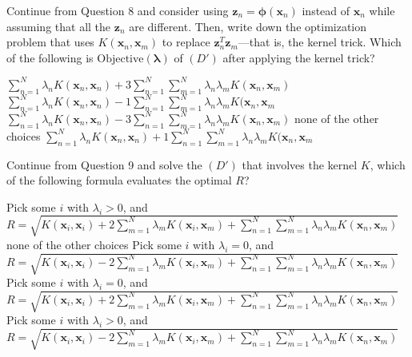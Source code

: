 \documentclass[a4paper,10pt]{exam}
\begin{document}
\begin{questions}
   \question Continue from Question 8 and consider using $\mathbf{z}_n = {\boldsymbol\phi}(\mathbf{x}_n)$ instead of $\mathbf{x}_n$ while assuming that all the $\mathbf{z}_n$ are different. Then, write down the optimization problem that uses $K(\mathbf{x}_n, \mathbf{x}_m)$ to replace $\mathbf{z}_n^T \mathbf{z}_m$---that is, the kernel trick. Which of the following is $\mbox{Objective}(\boldsymbol\lambda)$ of $(D′)$ after applying the kernel trick?
   \begin{checkboxes}
   	\choice $\sum_{n=1}^N \lambda_n K(\mathbf{x}_n, \mathbf{x}_n) + 3\sum_{n=1}^N \sum_{m=1}^N \lambda_n \lambda_m K(\mathbf{x}_n, \mathbf{x}_m)$
    \CorrectChoice $\sum_{n=1}^N \lambda_n K(\mathbf{x}_n, \mathbf{x}_n) - 1\sum_{n=1}^N \sum_{m=1}^N \lambda_n \lambda_m K(\mathbf{x}_n, \mathbf{x}_m$
    \choice $\sum_{n=1}^N \lambda_n K(\mathbf{x}_n, \mathbf{x}_n) - 3\sum_{n=1}^N \sum_{m=1}^N \lambda_n \lambda_m K(\mathbf{x}_n, \mathbf{x}_m)$
    \choice none of the other choices
    \choice $\sum_{n=1}^N \lambda_n K(\mathbf{x}_n, \mathbf{x}_n) + 1\sum_{n=1}^N \sum_{m=1}^N \lambda_n \lambda_m K(\mathbf{x}_n, \mathbf{x}_m$\\
   	\end{checkboxes}
   
   \question Continue from Question 9 and solve the $(D′)$ that involves the kernel $K$, which of the following formula evaluates the optimal $R$?
   
   \begin{checkboxes}
   	\choice Pick some $i$ with $\lambda_i > 0$, and $R = \sqrt{K(\mathbf{x}_i, \mathbf{x}_i) + 2 \sum_{m=1}^N \lambda_m K(\mathbf{x}_i, \mathbf{x}_m) + \sum_{n=1}^N \sum_{m=1}^N \lambda_n \lambda_m K(\mathbf{x}_n, \mathbf{x}_m)}$
   	\choice none of the other choices
   	\choice Pick some $i$ with $\lambda_i = 0$, and $R = \sqrt{K(\mathbf{x}_i, \mathbf{x}_i) - 2 \sum_{m=1}^N \lambda_m K(\mathbf{x}_i, \mathbf{x}_m) + \sum_{n=1}^N \sum_{m=1}^N \lambda_n \lambda_m K(\mathbf{x}_n, \mathbf{x}_m)}$
   	\choice Pick some $i$ with $\lambda_i = 0$, and $R = \sqrt{K(\mathbf{x}_i, \mathbf{x}_i) + 2 \sum_{m=1}^N \lambda_m K(\mathbf{x}_i, \mathbf{x}_m) + \sum_{n=1}^N \sum_{m=1}^N \lambda_n \lambda_m K(\mathbf{x}_n, \mathbf{x}_m)}$
   	\CorrectChoice Pick some $i$ with $\lambda_i > 0$, and $R = \sqrt{K(\mathbf{x}_i, \mathbf{x}_i) - 2 \sum_{m=1}^N \lambda_m K(\mathbf{x}_i, \mathbf{x}_m) + \sum_{n=1}^N \sum_{m=1}^N \lambda_n \lambda_m K(\mathbf{x}_n, \mathbf{x}_m)}$\\
   \end{checkboxes}
   

\end{questions}
\end{document}
